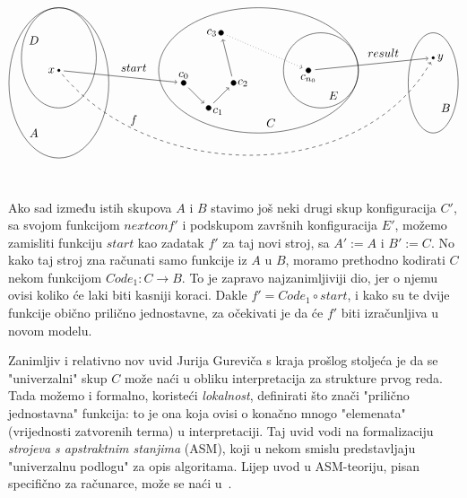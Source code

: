 \begin{equation}\label{dia:alg}
\begin{tikzpicture}[scale=0.75,baseline=(c0)]
\draw (0,0) ellipse (2 and 3);
\draw (8,0.5) ellipse (4 and 2.5);
\draw (15,0) ellipse (1 and 2);
\draw (0,1) ellipse (1.5 and 2);
\draw (10.5,0.5) circle (1.5);
\draw[fill] (0,0.5) coordinate (x) circle (0.05) node[left]{$x$};
\node at(-1,1.7) {$D$};
\node at(-1,-2) {$A$};
\node at(8.5,-1.6) {$C$};
\node at(11,-0.5) {$E$};
\node at(15.5,-1) {$B$};
\node at(3,0.6) {$start$};
\node at(13,1.2) {$result$};
\node at(3,-1.5) {$f$};
\draw[fill] (5,0) coordinate (c0) circle (0.1) node[above]{$c_0$};
\draw[fill] (6,-1) coordinate (c1) circle (0.1) node[right,yshift=-3]{$c_1$};
\draw[fill] (7,0) coordinate (c2) circle (0.1) node[right]{$c_2$};
\draw[fill] (6.5,2) coordinate (c3) circle (0.1) node[left]{$c_3$};
\draw[fill] (10,0.5) coordinate (cn0) circle (0.1) node[below]{$c_{n_0}$};
\draw[fill] (15,1) coordinate (y) circle (0.05) node[right]{$y$};
\draw[shorten <=1.5mm,shorten >=2mm,->] (x) -- (c0);
\draw[shorten <=2mm,shorten >=2mm,->] (c0) -- (c1);
\draw[shorten <=2mm,shorten >=2mm,->] (c1) -- (c2);
\draw[shorten <=2mm,shorten >=2mm,->] (c2) -- (c3);
\draw[dotted,shorten <=2mm,shorten >=2mm,->] (c3) -- (cn0);
\draw[shorten <=2mm,shorten >=1.5mm,->] (cn0) -- (y);
\draw[shorten <=1.5mm, shorten >=1.5mm,dashed,->] (x) to[in=240,out=-50] (y);
\end{tikzpicture}    
\end{equation}


Ako sad između istih skupova $A$ i $B$ stavimo još neki drugi skup konfiguracija $C'$, sa svojom funkcijom $nextconf'$ i podskupom završnih konfiguracija $E'$, možemo zamisliti funkciju $start$ kao zadatak $f'$ za taj novi stroj, sa $A':=A$ i $B':=C$. No kako taj stroj zna računati samo funkcije iz $A$ u $B$, moramo prethodno kodirati $C$ nekom funkcijom $Code_1\colon C\to B$. To je zapravo najzanimljiviji dio, jer o njemu ovisi koliko će laki biti kasniji koraci. Dakle $f'=Code_1\circ start$, i kako su te dvije funkcije obično prilično jednostavne, za očekivati je da će $f'$ biti izračunljiva u novom modelu.

\begin{napomena}\label{nap:ASM}
Zanimljiv i relativno nov uvid Jurija Gureviča s kraja prošlog stoljeća je da se "univerzalni" skup $C$ može naći u obliku interpretacija za strukture prvog reda. Tada možemo i formalno, koristeći \emph{lokalnost}, definirati što znači "prilično jednostavna" funkcija: to je ona koja ovisi o konačno mnogo "elemenata" (vrijednosti zatvorenih terma) u interpretaciji. Taj uvid vodi na formalizaciju \emph{strojeva s apstraktnim stanjima} (ASM), koji u nekom smislu predstavljaju "univerzalnu podlogu" za opis algoritama. Lijep uvod u ASM-teoriju, pisan specifično za računarce, može se naći u~\cite{huggins}.
\end{napomena}


